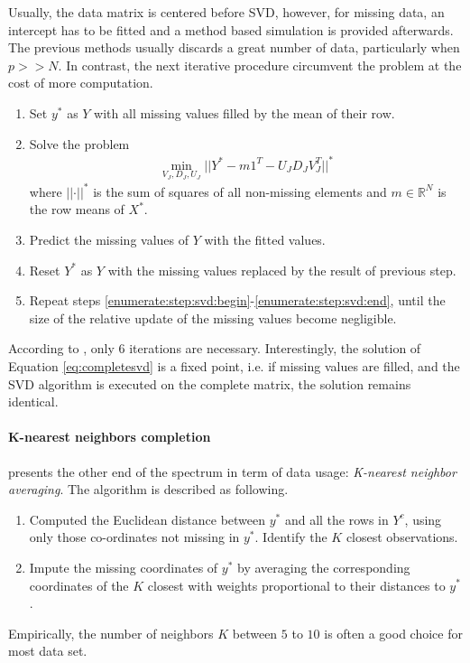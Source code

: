 Usually, the data matrix is centered before SVD, however, for missing data, an
intercept has to be fitted and a method based simulation is provided
afterwards. The previous methods usually discards a great number of data,
particularly when $p >> N$. In contrast, the next iterative procedure
circumvent the problem at the cost of more computation.

\begin{enumerate}[(1)]
\item  Set $y^*$ as $Y$ with all missing values filled by the mean of their
  row.
\item \label{enumerate:step:svd:begin} Solve the problem
  \begin{align} \label{eq:completesvd}
    \min_{V_J, D_J, U_J} \vert \vert Y^* - m 1^T - U_J D_J V_J^T \vert \vert^*
  \end{align}
  where $\vert\vert \cdot \vert\vert^*$ is the sum of squares of all non-missing
  elements and $m \in \mathbb{R}^N$ is the row means of $X^*$.
\item Predict the missing values of $Y$ with the fitted values.
\item Reset $Y^*$ as $Y$ with the missing values replaced by the result of
  previous step.
\item \label{enumerate:step:svd:end} Repeat steps
  \ref{enumerate:step:svd:begin}-\ref{enumerate:step:svd:end}, until the size
  of the relative update of the missing values become negligible.
\end{enumerate}

According to \cite{hastie1999imputing}, only 6 iterations are
necessary. Interestingly, the solution of Equation \eqref{eq:completesvd} is a
fixed point, i.e. if missing values are filled, and the SVD algorithm is
executed on the complete matrix, the solution remains identical.

\paragraph{K-nearest neighbors completion}

\cite{troyanskaya2001missing} presents the other end of the spectrum in term of
data usage: \emph{K-nearest neighbor averaging}. The algorithm is described as
following.
\begin{enumerate}
  \item Computed the Euclidean distance between $y^*$ and all the rows in $Y^c$,
    using only those co-ordinates not missing in $y^*$. Identify the $K$ closest
    observations.
  \item Impute the missing coordinates of $y^*$ by averaging the corresponding
    coordinates of the $K$ closest with weights proportional to their distances
    to $y^*$.
\end{enumerate}

Empirically, the number of neighbors $K$ between $5$ to $10$ is often a good
choice for most data set.

